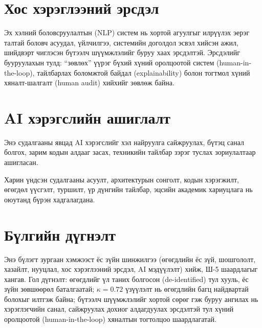 \section{Хос хэрэглээний эрсдэл}

Эх хэлний боловсруулалтын (NLP) систем нь хортой агуулгыг илрүүлэх эерэг талтай боловч асуудал, үйлчилгээ, системийн доголдол эсвэл хийсэн ажил, шийдвэрт чиглэсэн бүтээлч шүүмжлэлийг буруу хаах эрсдэлтэй. Эрсдэлийг бууруулахын тулд: ``зөвлөх'' үүрэг бүхий хүний оролцоотой систем (human-in-the-loop), тайлбарлах боломжтой байдал (explainability) болон тогтмол хүний хяналт-шалгалт (human audit) хийхийг зөвлөж байна.

\section{AI хэрэгслийн ашиглалт}
\label{sec:ai-disclosure}

Энэ судалгааны явцад AI хэрэгслийг хэл найруулга сайжруулах, бүтэц санал
болгох, зарим кодын алдааг засах, техникийн тайлбар зэрэг туслах зориулалтаар
ашигласан.

Харин үндсэн судалгааны асуулт, архитектурын сонголт, кодын хэрэгжилт, өгөгдөл
үүсгэлт, туршилт, үр дүнгийн тайлбар, эцсийн академик хариуцлага нь оюутанд
бүрэн хадгалагдана.

\section{Бүлгийн дүгнэлт}

Энэ бүлэгт зургаан хэмжээст ёс зүйн шинжилгээ (өгөгдлийн ёс зүй, шошгололт, хазайлт, нууцлал, хос хэрэглээний эрсдэл, AI мэдүүлэлт) хийж, Ш-5 шаардлагыг хангав. Гол дүгнэлт: өгөгдлийг үл таних болгосон (de-identified) тул хууль, ёс зүйн зөвшөөрөл баталгаатай; $\kappa{=}0.72$ үзүүлэлт нь өгөгдлийн багц найдвартай болохыг илтгэж байна; бүтээлч шүүмжлэлийг хортой сөрөг гэж буруу ангилах нь хэрэглэгчийн санал, сайжруулах дохиог алдагдуулах эрсдэлтэй тул хүний оролцоотой (human-in-the-loop) хяналтын тогтолцоо шаардлагатай.
